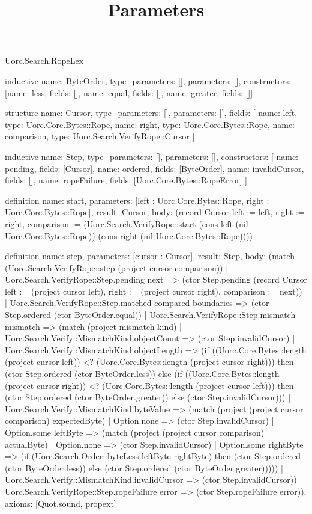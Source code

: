 \begin{lexlean}{Uorc.Search.RopeLex}
\title{Parameters}
\begin{semanticmodule}
inductive{
  name: ByteOrder,
  type_parameters: [],
  parameters: [],
  constructors: [{name: less, fields: []}, {name: equal, fields: []}, {name: greater, fields: []}]
}

structure{
  name: Cursor,
  type_parameters: [],
  parameters: [],
  fields: [
    {name: left, type: Uorc.Core.Bytes::Rope},
    {name: right, type: Uorc.Core.Bytes::Rope},
    {name: comparison, type: Uorc.Search.VerifyRope::Cursor}
  ]
}

inductive{
  name: Step,
  type_parameters: [],
  parameters: [],
  constructors: [
    {name: pending, fields: [Cursor]},
    {name: ordered, fields: [ByteOrder]},
    {name: invalidCursor, fields: []},
    {name: ropeFailure, fields: [Uorc.Core.Bytes::RopeError]}
  ]
}

definition{
  name: start,
  parameters: [left : Uorc.Core.Bytes::Rope, right : Uorc.Core.Bytes::Rope],
  result: Cursor,
  body: (record Cursor {left := left, right := right, comparison := (Uorc.Search.VerifyRope::start (cons left (nil Uorc.Core.Bytes::Rope)) (cons right (nil Uorc.Core.Bytes::Rope)))})
}

definition{
  name: step,
  parameters: [cursor : Cursor],
  result: Step,
  body: (match (Uorc.Search.VerifyRope::step (project cursor comparison))
    | Uorc.Search.VerifyRope::Step.pending next => (ctor Step.pending (record Cursor {left := (project cursor left), right := (project cursor right), comparison := next}))
    | Uorc.Search.VerifyRope::Step.matched compared boundaries => (ctor Step.ordered (ctor ByteOrder.equal))
    | Uorc.Search.VerifyRope::Step.mismatch mismatch => (match (project mismatch kind)
      | Uorc.Search.Verify::MismatchKind.objectCount => (ctor Step.invalidCursor)
      | Uorc.Search.Verify::MismatchKind.objectLength => (if ((Uorc.Core.Bytes::length (project cursor left)) <? (Uorc.Core.Bytes::length (project cursor right))) then (ctor Step.ordered (ctor ByteOrder.less)) else (if ((Uorc.Core.Bytes::length (project cursor right)) <? (Uorc.Core.Bytes::length (project cursor left))) then (ctor Step.ordered (ctor ByteOrder.greater)) else (ctor Step.invalidCursor)))
      | Uorc.Search.Verify::MismatchKind.byteValue => (match (project (project cursor comparison) expectedByte)
        | Option.none => (ctor Step.invalidCursor)
        | Option.some leftByte => (match (project (project cursor comparison) actualByte)
          | Option.none => (ctor Step.invalidCursor)
          | Option.some rightByte => (if (Uorc.Search.Order::byteLess leftByte rightByte) then (ctor Step.ordered (ctor ByteOrder.less)) else (ctor Step.ordered (ctor ByteOrder.greater)))))
      | Uorc.Search.Verify::MismatchKind.invalidCursor => (ctor Step.invalidCursor))
    | Uorc.Search.VerifyRope::Step.ropeFailure error => (ctor Step.ropeFailure error)),
  axioms: [Quot.sound, propext]
}
\end{semanticmodule}
\end{lexlean}
